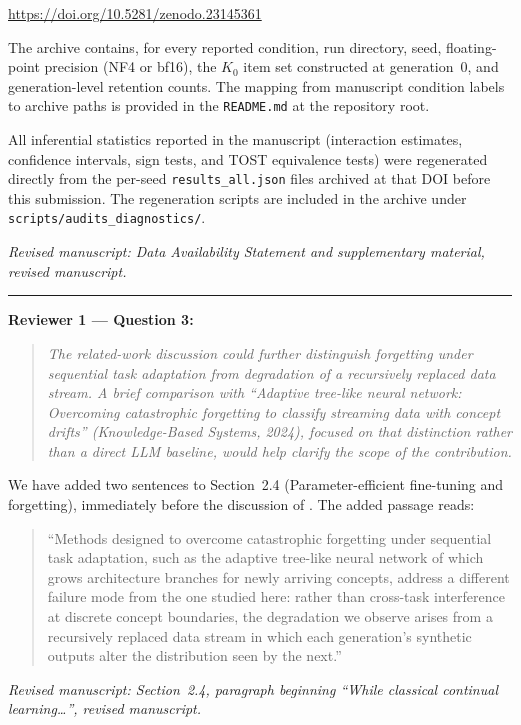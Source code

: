 \documentclass[11pt,a4paper]{article}
\newcommand{\rconcern}[3]{%
  \bigskip\noindent\rule{\linewidth}{0.4pt}\par\medskip
  \noindent\textbf{\textcolor{rccolor}{#1 --- #2:}}\par
  \smallskip
  \begin{quote}\itshape\textcolor{rccolor}{#3}\end{quote}%
}
\newcommand{\newtext}[1]{\textcolor{chgcolor}{``#1''}}
\newcommand{\msloc}[1]{%
  \smallskip\noindent\textit{Revised manuscript: #1}\par%
}
\begin{document}
\begin{center}
\url{https://doi.org/10.5281/zenodo.23145361}
\end{center}

The archive contains, for every reported condition, run directory, seed,
floating-point precision (NF4 or bf16), the $K_0$ item set constructed at
generation~0, and generation-level retention counts.
The mapping from manuscript condition labels to archive paths is provided
in the \texttt{README.md} at the repository root.

All inferential statistics reported in the manuscript (interaction estimates,
confidence intervals, sign tests, and TOST equivalence tests) were
regenerated directly from the per-seed \texttt{results\_all.json} files
archived at that DOI before this submission.
The regeneration scripts are included in the archive under
\texttt{scripts/audits\_diagnostics/}.

\msloc{Data Availability Statement and supplementary material,
revised manuscript.}

\rconcern{Reviewer 1}{Question 3}{%
The related-work discussion could further distinguish forgetting under
sequential task adaptation from degradation of a recursively replaced data
stream. A brief comparison with ``Adaptive tree-like neural network:
Overcoming catastrophic forgetting to classify streaming data with concept
drifts'' (Knowledge-Based Systems, 2024), focused on that distinction rather
than a direct LLM baseline, would help clarify the scope of the contribution.}

We have added two sentences to Section~2.4 (Parameter-efficient fine-tuning
and forgetting), immediately before the discussion of \citet{biderman2024}.
The added passage reads:

\begin{quote}
\newtext{Methods designed to overcome catastrophic forgetting under sequential
task adaptation, such as the adaptive tree-like neural network of
\citet{wen2024} which grows architecture branches for newly arriving concepts,
address a different failure mode from the one studied here: rather than
cross-task interference at discrete concept boundaries, the degradation we
observe arises from a recursively replaced data stream in which each
generation's synthetic outputs alter the distribution seen by the next.}
\end{quote}

\msloc{Section~2.4, paragraph beginning ``While classical continual
learning\ldots'', revised manuscript.}
\end{document}
